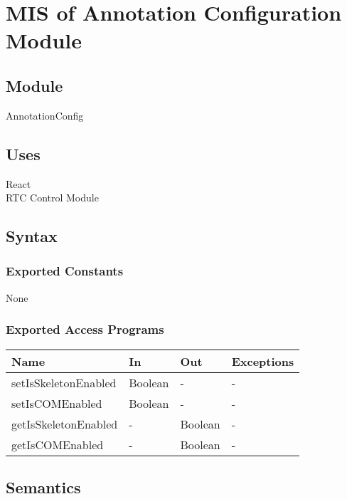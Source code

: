 \documentclass[12pt, titlepage]{article}
\begin{document}
\section{MIS of Annotation Configuration Module}
\label{sec:annotationconfig}

\subsection{Module}
AnnotationConfig

\subsection{Uses}
React\\
RTC Control Module

\subsection{Syntax}

\subsubsection{Exported Constants}
None

\subsubsection{Exported Access Programs}
\begin{table}[h!]
  \centering
  \begin{tabular}{llll}
    \toprule
    \textbf{Name}              & \textbf{In}        & \textbf{Out}    & \textbf{Exceptions} \\
    \midrule
    setIsSkeletonEnabled       & Boolean            & -               & -                   \\
    setIsCOMEnabled            & Boolean            & -               & -                   \\
    getIsSkeletonEnabled       & -                  & Boolean         & -                   \\
    getIsCOMEnabled            & -                  & Boolean         & -                   \\
    \bottomrule
  \end{tabular}
\end{table}

\subsection{Semantics}
\end{document}
